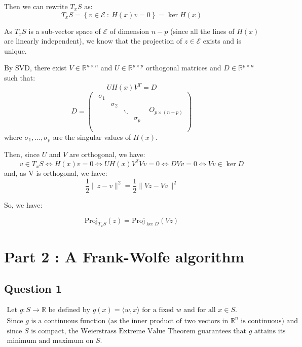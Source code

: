 \documentclass[12p]{article}
\newcommand*{\proj}{\text{Proj}}
\newcommand*{\es}{\mathcal{E}}
\begin{document}
Then we can rewrite \(T_xS\) as:
\[
  T_xS=\left\{v\in \es \ : \ H(x)v=0\right\} =\ker H(x)  
\]

As \(T_xS\) is a sub-vector space of \(\es\) of dimension \(n-p\) (since all the lines of \(H(x)\) are linearly independent), we know that the projection of \(z\in \es\) exists and is unique. 

By SVD, there exist \(V\in\mathbb{R}^{n\times n}\) and \(U\in\mathbb{R}^{p\times p}\) orthogonal matrices and \(D\in\mathbb{R}^{p\times n}\) such that:
\[
  UH(x)V^T=D
\]
\[
  D=\begin{pmatrix}
    \begin{matrix}
    \sigma_1 &  &  & \\
     & \sigma_2 &  & \\
     &  & \ddots & \\
     &  &  & \sigma_p\\
    \end{matrix} & O_{p\times(n-p)}\\
    \end{pmatrix}  
\]
where \(\sigma_1,\dots,\sigma_p\) are the singular values of \(H(x)\).

Then, since \(U\) and \(V\) are orthogonal, we have:
\[
  v\in T_xS\iff H(x)v=0\iff UH(x)V^TVv=0\iff DVv=0\iff Vv\in \ker D  
\]
and, as V is orthogonal, we have:
\[
  \frac{1}{2}\|z-v\|^2= \frac{1}{2}\|Vz-Vv\|^2  
\]

So, we have:

\[
  \proj_{T_xS}(z)= \proj_{\ker D}(Vz) 
\]

\newpage


\section*{Part 2 : A Frank-Wolfe algorithm} 


\subsection*{Question 1}
\begin{align*}
    \text{Let } g : S \rightarrow \mathbb{R} \text{ be defined by } g(x) = \langle w, x \rangle \text{ for a fixed } w \text{ and for all } x \in S. \\
\text{Since } g \text{ is a continuous function (as the inner product of two vectors in } \mathbb{R}^n \text{ is continuous) and } \\
\text{since } S \text{ is compact, the Weierstrass Extreme Value Theorem guarantees that } g \text{ attains its  } \\
\text{minimum and maximum on } S.
\end{align*} 
\end{document}
